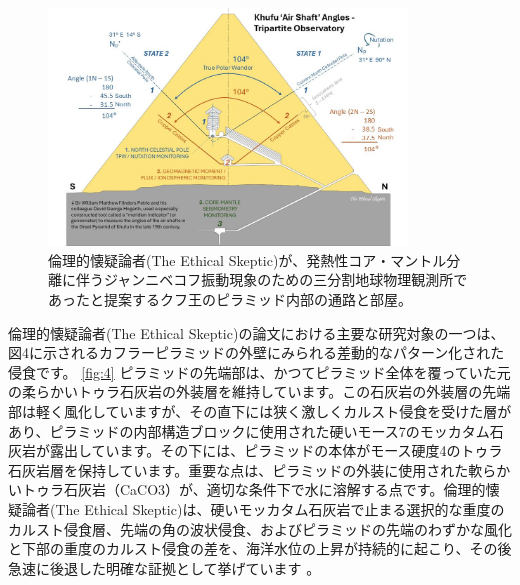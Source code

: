 \documentclass[10pt,twocolumn,letterpaper]{article}
\begin{document}
\begin{figure}[b]
\begin{center}
\includegraphics[width=0.85\textwidth]{shafts.jpg}
\end{center}
   \caption{倫理的懐疑論者(The Ethical Skeptic)が、発熱性コア・マントル分離に伴うジャンニベコフ振動現象のための三分割地球物理観測所であったと提案するクフ王のピラミッド内部の通路と部屋\cite{28}。}
\label{fig:5}
\end{figure}
倫理的懐疑論者(The Ethical Skeptic)の論文における主要な研究対象の一つは、図4に示されるカフラーピラミッドの外壁にみられる差動的なパターン化された侵食です。 \ref{fig:4} ピラミッドの先端部は、かつてピラミッド全体を覆っていた元の柔らかいトゥラ石灰岩の外装層を維持しています。この石灰岩の外装層の先端部は軽く風化していますが、その直下には狭く激しくカルスト侵食を受けた層があり、ピラミッドの内部構造ブロックに使用された硬いモース7のモッカタム石灰岩が露出しています。その下には、ピラミッドの本体がモース硬度4のトゥラ石灰岩層を保持しています。重要な点は、ピラミッドの外装に使用された軟らかいトゥラ石灰岩（CaCO3）が、適切な条件下で水に溶解する点です。倫理的懐疑論者(The Ethical Skeptic)は、硬いモッカタム石灰岩で止まる選択的な重度のカルスト侵食層、先端の角の波状侵食、およびピラミッドの先端のわずかな風化と下部の重度のカルスト侵食の差を、海洋水位の上昇が持続的に起こり、その後急速に後退した明確な証拠として挙げています \cite{27}。

\end{document}
